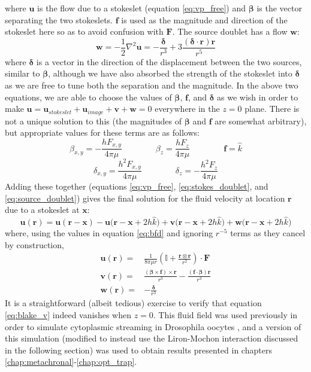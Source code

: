 \documentclass[11pt]{ucthesis}
\begin{document}
where $\mathbf{u}$ is the flow due to a stokeslet (equation \ref{eq:vp_free}) and $\boldsymbol{\beta}$ is the vector separating the two stokeslets. $\mathbf{f}$ is used as the magnitude and direction of the stokeslet here so as to avoid confusion with $\mathbf{F}$. The source doublet has a flow $\mathbf{w}$:
\begin{equation}
\label{eq:source_doublet}
\mathbf{w} = -\frac12 \nabla^2 \mathbf{u} = -\frac{\boldsymbol{\delta}}{r^3} + 3\frac{(\boldsymbol{\delta}\cdot\mathbf{r})\mathbf{r}}{r^5}
\end{equation}
where $\boldsymbol{\delta}$ is a vector in the direction of the displacement between the two sources, similar to $\boldsymbol{\beta}$, although we have also absorbed the strength of the stokeslet into $\boldsymbol{\delta}$ as we are free to tune both the separation and the magnitude. In the above two equations, we are able to choose the values of $\boldsymbol{\beta}$, $\mathbf{f}$, and $\boldsymbol{\delta}$ as we wish in order to make $\mathbf{u}=\mathbf{u}_{stokeslet}+\mathbf{u}_{image}+\mathbf{v}+\mathbf{w} = 0$ everywhere in the $z=0$ plane. There is not a unique solution to this (the magnitudes of $\boldsymbol{\beta}$ and $\mathbf{f}$ are somewhat arbitrary), but appropriate values for these terms are as follows:
\[
\beta_{x,y} = -\frac{hF_{x,y}}{4\pi\mu} \qquad\qquad \beta_{z} = \frac{hF_{z}}{4\pi\mu} \qquad\qquad \mathbf{f} = \hat{k}
\]
\begin{equation}
\label{eq:bfd}
\delta_{x,y} = \frac{h^2F_{x,y}}{4\pi\mu} \qquad\qquad \delta_z = -\frac{h^2F_z}{4\pi\mu}
\end{equation}
Adding these together (equations \ref{eq:vp_free}, \ref{eq:stokes_doublet}, and \ref{eq:source_doublet}) gives the final solution for the fluid velocity at location $\mathbf{r}$ due to a stokeslet at $\mathbf{x}$:
\begin{equation}
\label{eq:blake_v}
\mathbf{u(r)} = \mathbf{u(r-x)}-\mathbf{u(r-x}+2h\hat{k})+\mathbf{v(r-x}+2h\hat{k})+\mathbf{w(r-x}+2h\hat{k})
\end{equation}
where, using the values in equation \ref{eq:bfd} and ignoring $r^{-5}$ terms as they cancel by construction,
\begin{align*}
\mathbf{u(r)} =& \frac{1}{8\pi \mu r }\left(\mathbb{I} + \frac{\mathbf{r\otimes r}}{r^2}\right)\cdot\mathbf{F}\\
\mathbf{v(r)} =& \frac{(\boldsymbol{\beta}\times\mathbf{f})\times\mathbf{r}}{r^3} - \frac{(\mathbf{f}\cdot \boldsymbol{\beta})\mathbf{r}}{r^3}\\
\mathbf{w(r)} =& -\frac{\boldsymbol{\delta}}{r^3}
\end{align*}
It is a straightforward (albeit tedious) exercise to verify that equation \ref{eq:blake_v} indeed vanishes when $z=0$. This fluid field was used previously in order to simulate cytoplasmic streaming in Drosophila oocytes \cite{Monteith2016}, and a version of this simulation (modified to instead use the Liron-Mochon interaction discussed in the following section) was used to obtain results presented in chapters \ref{chap:metachronal}-\ref{chap:opt_trap}.
\end{document}
